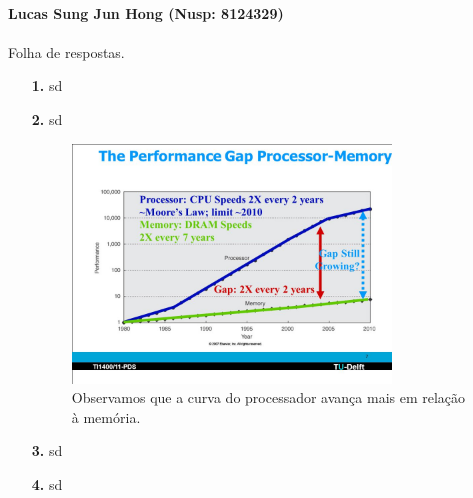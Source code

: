 \documentclass[12pt]{article}
\begin{document}
\begin{center}
{} \\
\vspace{0.5cm}
{}
\vspace{0.5cm}

\textbf{Lucas Sung Jun Hong (Nusp: 8124329)}
\end{center}

\paragraph{} Folha de respostas.

\begin{itemize}
  \item[{\bf 1.}] sd

  \item[{\bf 2.}] sd 

    \begin{figure}[ht]
      \caption{Observamos que a curva do processador avança mais em relação à memória.}
      \centering
        \includegraphics[width=0.8\textwidth]{img/slide_7.jpg}
    \end{figure}
    \vspace{0.5cm}

  \item[{\bf 3.}] sd 

  \item[{\bf 4.}] sd 

\end{itemize}
\end{document}
